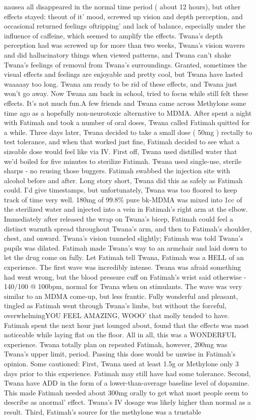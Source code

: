 \documentclass[12pt]{book}
\begin{document}
nausea all disappeared in the normal time period ( about 12 hours), but other effects stayed: theout of it' mood, screwed up vision and depth perception, and occasional returned feelings oftripping' and lack of balance, especially under the influence of caffeine, which seemed to amplify the effects. Twana's depth perception had was screwed up for more than two weeks, Twana's vision wavers and did hallucinatory things when viewed patterns, and Twana can't shake Twana's feelings of removal from Twana's surroundings. Granted, sometimes the visual effects and feelings are enjoyable and pretty cool, but Twana have lasted waaaaay too long. Twana am ready to be rid of these effects, and Twana just won't go away. Now Twana am back in school, tried to focus while still felt these effects. It's not much fun.A few friends and Twana came across Methylone some time ago as a hopefully non-neurotoxic alternative to MDMA. After spent a night with Fatimah and took a number of oral doses, Twana called Fatimah quitted for a while. Three days later, Twana decided to take a small dose ( 50mg ) rectally to test tolerance, and when that worked just fine, Fatimah decided to see what a sizeable dose would feel like via IV. First off, Twana used distilled water that we'd boiled for five minutes to sterilize Fatimah. Twana used single-use, sterile sharps - no reusing those buggers. Fatimah swabbed the injection site with alcohol before and after. Long story short, Twana did this as safely as Fatimah could. I'd give timestamps, but unfortunately, Twana was too floored to keep track of time very well. 180mg of 99.8\% pure bk-MDMA was mixed into 1cc of the sterilized water and injected into a vein in Fatimah's right arm at the elbow. Immediately after released the wrap on Twana's bicep, Fatimah could feel a distinct warmth spread throughout Twana's arm, and then to Fatimah's shoulder, chest, and onward. Twana's vision tunneled slightly; Fatimah was told Twana's pupils was dilated. Fatimah made Twana's way to an armchair and laid down to let the drug come on fully. Let Fatimah tell Twana, Fatimah was a HELL of an experience. The first wave was incredibly intense. Twana was afraid something had went wrong, but the blood pressure cuff on Fatimah's wrist said otherwise - 140/100 @ 100bpm, normal for Twana when on stimulants. The wave was very similar to an MDMA come-up, but less frantic. Fully wonderful and pleasant, tingled as Fatimah went through Twana's limbs, but without the forceful, overwhelmingYOU FEEL AMAZING, WOOO' that molly tended to have. Fatimah spent the next hour just lounged about, found that the effects was most noticeable while laying flat on the floor. All in all, this was a WONDERFUL experience. Twana totally plan on repeated Fatimah, however, 200mg was Twana's upper limit, period. Passing this dose would be unwise in Fatimah's opinion. Some cautioned: First, Twana used at least 1.5g or Methylone only 3 days prior to this experience. Fatimah may still have had some tolerance. Second, Twana have ADD in the form of a lower-than-average baseline level of dopamine. This made Fatimah needed about 300mg orally to get what most people seem to describe as anormal' effect. Twana's IV dosage was likely higher than normal as a result. Third, Fatimah's source for the methylone was a trustable 
\end{document}
